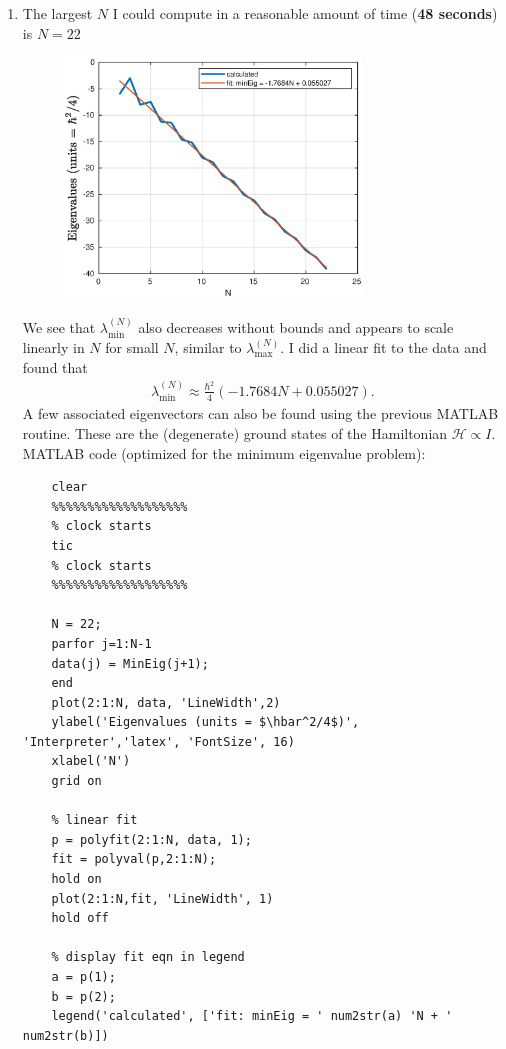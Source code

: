\documentclass{article}
\theoremstyle{definition}
\newcommand{\ham}{\mathcal{H}}
\newcommand{\f}[2]{\frac{#1}{#2}}
\newcommand{\lp}{\left(}
\newcommand{\rp}{\right)}
\begin{document}
\begin{enumerate}[label=(\alph*)]
	\item The largest $N$ I could compute in a reasonable amount of time (\textbf{48 seconds}) is $\boxed{N=22}$
	\begin{figure}[!htb]
		\centering
		\includegraphics[width=0.75\textwidth]{2f.eps}
	\end{figure}

 
	We see that $\lambda_{\text{min}}^{(N)}$ also decreases without bounds and appears to scale linearly in $N$ for small $N$, similar to $\lambda_\text{max}^{(N)}$. I did a linear fit to the data and found that 
	\begin{align*}
	\lambda_\text{min}^{(N)} \approx \f{\hbar^2}{4}\lp -1.7684N + 0.055027\rp .
	\end{align*} 
	A few associated eigenvectors can also be found using the previous MATLAB routine. These are the (degenerate) ground states of the Hamiltonian $\ham \propto I$.  \\
	
	
	
	
	
	MATLAB code (optimized for the minimum eigenvalue problem):
	\begin{lstlisting}
	clear 
	%%%%%%%%%%%%%%%%%%%
	% clock starts
	tic 
	% clock starts
	%%%%%%%%%%%%%%%%%%%
	
	N = 22;
	parfor j=1:N-1
	data(j) = MinEig(j+1);
	end
	plot(2:1:N, data, 'LineWidth',2)
	ylabel('Eigenvalues (units = $\hbar^2/4$)', 'Interpreter','latex', 'FontSize', 16)
	xlabel('N')
	grid on
	
	% linear fit
	p = polyfit(2:1:N, data, 1);
	fit = polyval(p,2:1:N);
	hold on
	plot(2:1:N,fit, 'LineWidth', 1)
	hold off
	
	% display fit eqn in legend
	a = p(1);
	b = p(2);
	legend('calculated', ['fit: minEig = ' num2str(a) 'N + ' num2str(b)])
	

\end{lstlisting}
\end{enumerate}
\end{document}

